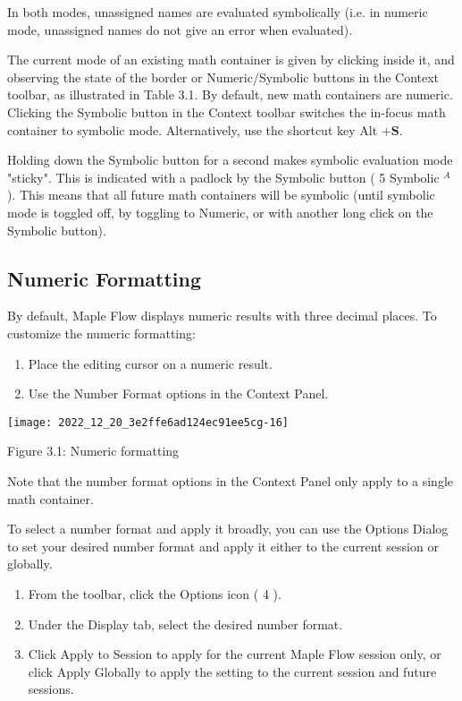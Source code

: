 In both modes, unassigned names are evaluated symbolically (i.e. in numeric mode, unassigned names do not give an error when evaluated).

The current mode of an existing math container is given by clicking inside it, and observing the state of the border or Numeric/Symbolic buttons in the Context toolbar, as illustrated in Table 3.1. By default, new math containers are numeric. Clicking the Symbolic button in the Context toolbar switches the in-focus math container to symbolic mode. Alternatively, use the shortcut key Alt $+\mathbf{S}$.

Holding down the Symbolic button for a second makes symbolic evaluation mode "sticky". This is indicated with a padlock by the Symbolic button ( 5 Symbolic ${ }^{A}$ ). This means that all future math containers will be symbolic (until symbolic mode is toggled off, by toggling to Numeric, or with another long click on the Symbolic button).

\subsection{Numeric Formatting}
By default, Maple Flow displays numeric results with three decimal places. To customize the numeric formatting:

\begin{enumerate}
  \item Place the editing cursor on a numeric result.

  \item Use the Number Format options in the Context Panel.

\end{enumerate}

\begin{center}
\texttt{[image: 2022\_12\_20\_3e2ffe6ad124ec91ee5cg-16]}
\end{center}

Figure 3.1: Numeric formatting

Note that the number format options in the Context Panel only apply to a single math container.

To select a number format and apply it broadly, you can use the Options Dialog to set your desired number format and apply it either to the current session or globally.

\begin{enumerate}
  \item From the toolbar, click the Options icon ( 4 ).

  \item Under the Display tab, select the desired number format.

  \item Click Apply to Session to apply for the current Maple Flow session only, or click Apply Globally to apply the setting to the current session and future sessions.

\end{enumerate}


